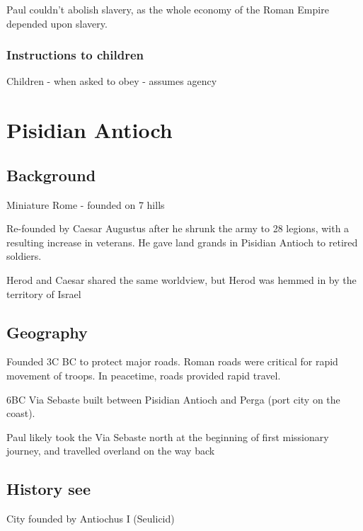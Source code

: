 \documentclass[
]{book}
\begin{document}
Paul couldn't abolish slavery, as the whole economy of the Roman Empire depended upon slavery.

\hypertarget{instructions-to-children}{%
\subsection{Instructions to children}\label{instructions-to-children}}

Children - when asked to obey - assumes agency

\hypertarget{pisidian-antioch}{%
\chapter{Pisidian Antioch}\label{pisidian-antioch}}

\hypertarget{background}{%
\section{Background}\label{background}}

Miniature Rome - founded on 7 hills

Re-founded by Caesar Augustus after he shrunk the army to 28 legions, with a resulting increase in veterans. He gave land grands in Pisidian Antioch to retired soldiers.

Herod and Caesar shared the same worldview, but Herod was hemmed in by the territory of Israel

\hypertarget{geography-2}{%
\section{Geography}\label{geography-2}}

Founded 3C BC to protect major roads. Roman roads were critical for rapid movement of troops. In peacetime, roads provided rapid travel.

6BC Via Sebaste built between Pisidian Antioch and Perga (port city on the coast).

Paul likely took the Via Sebaste north at the beginning of first missionary journey, and travelled overland on the way back

\hypertarget{history-see}{%
\section{History see}\label{history-see}}

City founded by Antiochus I (Seulicid)
\end{document}
